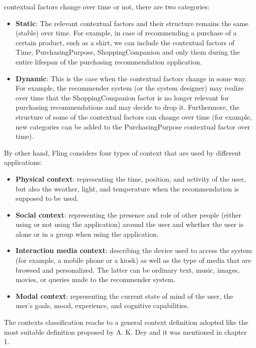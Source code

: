 \begin{enumerate}
contextual factors change over time or not, there are two categories: 
	\begin{itemize}
	\item \textbf{Static}: The relevant contextual factors and their structure
	remains the same (stable) over time. For example, in case of recommending a
	purchase of a certain product, such as a shirt, we can include the
	contextual factors of Time, PurchasingPurpose, ShoppingCompanion and only
	them during the entire lifespan of the purchasing recommendation
	application.
	\item \textbf {Dynamic}: This is the case when the contextual factors change in 
	some way. For example, the recommender system (or the system designer) may 
	realize over time that the ShoppingCompanion factor is no longer relevant for 
	purchasing recommendations and may decide to drop it. Furthermore, the structure 
	of some of the contextual factors can change over time (for example, new 
	categories can be added to the PurchasingPurpose contextual factor over time).
	\end{itemize}
\end{enumerate} 
By other hand, Fling\cite{fling2009mobile} considers four types of context that 
are used by different applications: 
\begin{itemize} 
\item \textbf{Physical context}: representing the time, position, and activity 
of the user, but also the weather, light, and temperature when the 
recommendation is supposed to be used. 
\item \textbf{Social context}: representing the presence
and role of other people (either using or not using the application) around the
user and whether the user is alone or in a group when using the application.
\item \textbf{Interaction media context}: describing the device used to access
the system (for example, a mobile phone or a kiosk) as well as the type of media
that are browsed and personalized. The latter can be ordinary text, music,
images, movies, or queries made to the recommender system. 
\item \textbf{Modal context}: representing the current state of mind of the user, 
the user’s goals, mood, experience, and cognitive capabilities.  
\end{itemize}
The contexts classification reachs to a general context definition
adopted like the most suitable definition proposed by A. K. Dey  and it
was mentioned in chapter 1.\\ 
